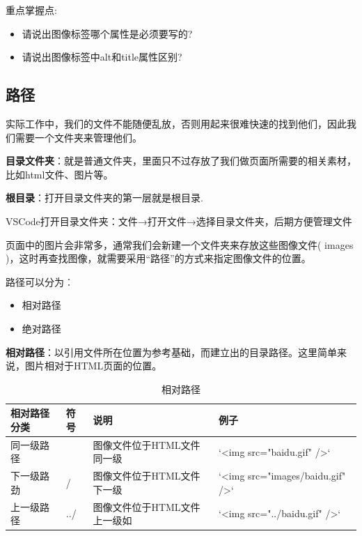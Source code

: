 \documentclass[
]{book}
\providecommand{\tightlist}{%
  \setlength{\itemsep}{0pt}\setlength{\parskip}{0pt}}
\begin{document}
重点掌握点:

\begin{itemize}
\tightlist
\item
  请说出图像标签哪个属性是必须要写的?
\item
  请说出图像标签中alt和title属性区别?
\end{itemize}

\hypertarget{ux8defux5f84}{%
\subsection{路径}\label{ux8defux5f84}}

实际工作中，我们的文件不能随便乱放，否则用起来很难快速的找到他们，因此我们需要一个文件夹来管理他们。

\textbf{目录文件夹}：就是普通文件夹，里面只不过存放了我们做页面所需要的相关素材，比如html文件、图片等。

\textbf{根目录}：打开目录文件夹的第一层就是根目录.

VSCode打开目录文件夹：文件→打开文件→选择目录文件夹，后期方便管理文件

页面中的图片会非常多，通常我们会新建一个文件夹来存放这些图像文件( images )，这时再查找图像，就需要采用``路径''的方式来指定图像文件的位置。

路径可以分为︰

\begin{itemize}
\tightlist
\item
  相对路径
\item
  绝对路径
\end{itemize}

\textbf{相对路径}：以引用文件所在位置为参考基础，而建立出的目录路径。这里简单来说，图片相对于HTML页面的位置。

\begin{table}

\caption{\label{tab:unnamed-chunk-10}相对路径}
\centering
\begin{tabular}[t]{llll}
\toprule
相对路径分类 & 符号 & 说明 & 例子\\
\midrule
同一级路径 &  & 图像文件位于HTML文件同一级 & `<img src="baidu.gif" />`\\
下一级路劲 & / & 图像文件位于HTML文件下一级 & `<img src="images/baidu.gif" />`\\
上一级路径 & ../ & 图像文件位于HTML文件上一级如 & `<img src="../baidu.gif" />`\\
\bottomrule
\end{tabular}
\end{table}
\end{document}
